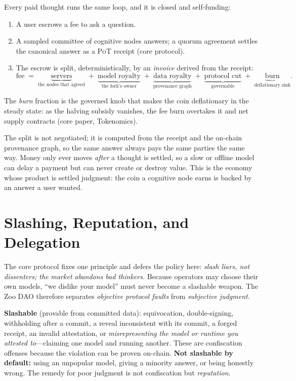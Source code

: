 \documentclass[11pt]{article}
\newcommand{\PoT}{\textsc{PoT}}
\begin{document}
Every paid thought runs the same loop, and it is closed and self-funding:

\begin{enumerate}[leftmargin=1.4em]
\item A user escrows a fee to ask a question.
\item A sampled committee of cognitive nodes answers; a quorum agreement settles the canonical answer as a \PoT{} receipt (core protocol).
\item The escrow is split, deterministically, by an \emph{invoice} derived from the receipt:
\[
\text{fee} \;=\; \underbrace{\text{servers}}_{\text{the nodes that agreed}} \;+\; \underbrace{\text{model royalty}}_{\text{the fork's owner}} \;+\; \underbrace{\text{data royalty}}_{\text{provenance graph}} \;+\; \underbrace{\text{protocol cut}}_{\text{governable}} \;+\; \underbrace{\text{burn}}_{\text{deflationary sink}}.
\]
\end{enumerate}
The \emph{burn} fraction is the governed knob that makes the coin deflationary in the steady state: as the halving subsidy vanishes, the fee burn overtakes it and net supply contracts (core paper, Tokenomics).

The split is not negotiated; it is computed from the receipt and the on-chain provenance graph, so the same answer always pays the same parties the same way. Money only ever moves \emph{after} a thought is settled, so a slow or offline model can delay a payment but can never create or destroy value. This is the economy whose product is settled judgment: the coin a cognitive node earns is backed by an answer a user wanted.

\section{Slashing, Reputation, and Delegation}

The core protocol fixes one principle and defers the policy here: \emph{slash liars, not dissenters; the market abandons bad thinkers.} Because operators may choose their own models, ``we dislike your model'' must never become a slashable weapon. The Zoo DAO therefore separates \emph{objective protocol faults} from \emph{subjective judgment}.

\textbf{Slashable} (provable from committed data): equivocation, double-signing, withholding after a commit, a reveal inconsistent with its commit, a forged receipt, an invalid attestation, or \emph{misrepresenting the model or runtime you attested to}---claiming one model and running another. These are confiscation offenses because the violation can be proven on-chain. \textbf{Not slashable by default:} using an unpopular model, giving a minority answer, or being honestly wrong. The remedy for poor judgment is not confiscation but \emph{reputation}.
\end{document}
